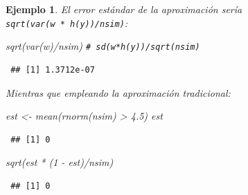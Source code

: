 \documentclass[
  10pt,
]{book}
\newenvironment{Shaded}{\begin{snugshade}}{\end{snugshade}}
\newcommand{\CommentTok}[1]{\textcolor[rgb]{0.56,0.35,0.01}{\textit{#1}}}
\newcommand{\DecValTok}[1]{\textcolor[rgb]{0.00,0.00,0.81}{#1}}
\newcommand{\FloatTok}[1]{\textcolor[rgb]{0.00,0.00,0.81}{#1}}
\newcommand{\FunctionTok}[1]{\textcolor[rgb]{0.00,0.00,0.00}{#1}}
\newcommand{\NormalTok}[1]{#1}
\newcommand{\OtherTok}[1]{\textcolor[rgb]{0.56,0.35,0.01}{#1}}
\newcommand{\SpecialCharTok}[1]{\textcolor[rgb]{0.00,0.00,0.00}{#1}}
\theoremstyle{break}
\newtheorem{example}{Ejemplo}[chapter]
\theoremstyle{nonumberplain}
\renewcommand{\CommentTok}[1]{\textcolor[rgb]{0.41,0.41,0.41}{\texttt{#1}}}
\begin{document}
\begin{example}
El error estándar de la aproximación sería \texttt{sqrt(var(w\ *\ h(y))/nsim)}:

\begin{Shaded}
\begin{Highlighting}[]
\FunctionTok{sqrt}\NormalTok{(}\FunctionTok{var}\NormalTok{(w)}\SpecialCharTok{/}\NormalTok{nsim) }\CommentTok{\# sd(w*h(y))/sqrt(nsim)   }
\end{Highlighting}
\end{Shaded}

\begin{verbatim}
 ## [1] 1.3712e-07
\end{verbatim}

Mientras que empleando la aproximación tradicional:

\begin{Shaded}
\begin{Highlighting}[]
\NormalTok{est }\OtherTok{\textless{}{-}} \FunctionTok{mean}\NormalTok{(}\FunctionTok{rnorm}\NormalTok{(nsim) }\SpecialCharTok{\textgreater{}} \FloatTok{4.5}\NormalTok{)}
\NormalTok{est}
\end{Highlighting}
\end{Shaded}

\begin{verbatim}
 ## [1] 0
\end{verbatim}

\begin{Shaded}
\begin{Highlighting}[]
\FunctionTok{sqrt}\NormalTok{(est }\SpecialCharTok{*}\NormalTok{ (}\DecValTok{1} \SpecialCharTok{{-}}\NormalTok{ est)}\SpecialCharTok{/}\NormalTok{nsim)}
\end{Highlighting}
\end{Shaded}

\begin{verbatim}
 ## [1] 0
\end{verbatim}

\end{example}
\end{document}
